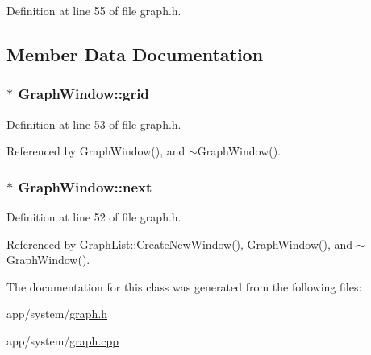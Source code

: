 Definition at line 55 of file graph.\+h.



\subsection{Member Data Documentation}
\subsubsection[{\texorpdfstring{grid}{grid}}]{$\ast$ Graph\+Window\+::grid\hspace{0.3cm}{\ttfamily [protected]}}\hypertarget{classGraphWindow_a53b8af9da3f6900be2e8abd569240be6}{}\label{classGraphWindow_a53b8af9da3f6900be2e8abd569240be6}


Definition at line 53 of file graph.\+h.



Referenced by Graph\+Window(), and $\sim$\+Graph\+Window().

\subsubsection[{\texorpdfstring{next}{next}}]{$\ast$ Graph\+Window\+::next\hspace{0.3cm}{\ttfamily [protected]}}\hypertarget{classGraphWindow_af84f61254f44fd2ef6b45ab703e45feb}{}\label{classGraphWindow_af84f61254f44fd2ef6b45ab703e45feb}


Definition at line 52 of file graph.\+h.



Referenced by Graph\+List\+::\+Create\+New\+Window(), Graph\+Window(), and $\sim$\+Graph\+Window().



The documentation for this class was generated from the following files\+:\begin{DoxyCompactItemize}
\item 
app/system/\hyperlink{graph_8h}{graph.\+h}\item 
app/system/\hyperlink{graph_8cpp}{graph.\+cpp}\end{DoxyCompactItemize}
